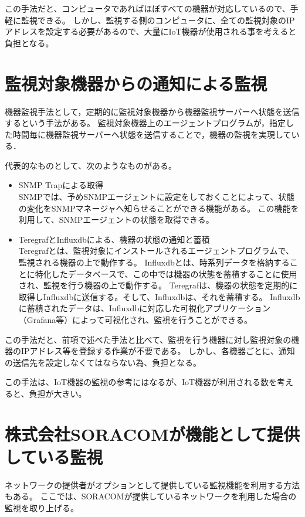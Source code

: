 	この手法だと、コンピュータであればほぼすべての機器が対応しているので、手軽に監視できる。
	しかし、監視する側のコンピュータに、全ての監視対象のIPアドレスを設定する必要があるので、大量にIoT機器が使用される事を考えると負担となる。

\section{監視対象機器からの通知による監視}
	機器監視手法として，定期的に監視対象機器から機器監視サーバーへ状態を送信するという手法がある。
	監視対象機器上のエージェントプログラムが，指定した時間毎に機器監視サーバーへ状態を送信することで，機器の監視を実現している．
	\medskip
	
	代表的なものとして、次のようなものがある。
	\begin{itemize}
		\item SNMP Trapによる取得\\
			SNMPでは、予めSNMPエージェントに設定をしておくことによって、状態の変化をSNMPマネージャへ知らせることができる機能がある。
			この機能を利用して、SNMPエージェントの状態を取得できる。
		\item TeregrafとInfluxdbによる、機器の状態の通知と蓄積\\
					Teregrafとは、監視対象にインストールされるエージェントプログラムで、監視される機器の上で動作する。
					Influxdbとは、時系列データを格納することに特化したデータベースで、この中では機器の状態を蓄積することに使用され、監視を行う機器の上で動作する。
					Teregrafは、機器の状態を定期的に取得しInfluxdbに送信する。そして、Influxdbは、それを蓄積する。
					Influxdbに蓄積されたデータは、Influxdbに対応した可視化アプリケーション（Grafana等）によって可視化され、監視を行うことができる。
	\end{itemize}
	
	この手法だと、前項で述べた手法と比べて、監視を行う機器に対し監視対象の機器のIPアドレス等を登録する作業が不要である。
	しかし、各機器ごとに、通知の送信先を設定しなくてはならない為、負担となる。

	この手法は、IoT機器の監視の参考にはなるが、IoT機器が利用される数を考えると、負担が大きい。

\section{株式会社SORACOMが機能として提供している監視} %
	ネットワークの提供者がオプションとして提供している監視機能を利用する方法もある。
	ここでは、SORACOMが提供しているネットワークを利用した場合の監視を取り上げる。
	
